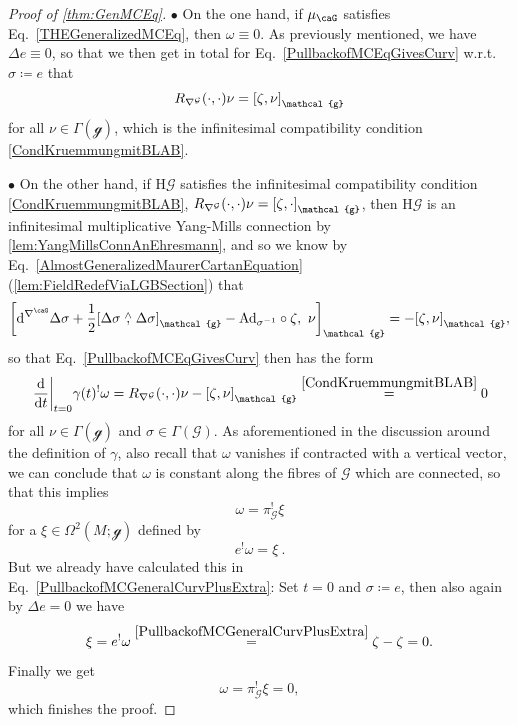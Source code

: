 \documentclass[reqno,a4paper,oneside]{amsart}
\newcommand\mutot{\mu_\caG}
\theoremstyle{plain}
\theoremstyle{remark}
\theoremstyle{definition}
\begin{document}
\begin{proof}[Proof of \ref{thm:GenMCEq}]
$\bullet$ On the one hand, if $\mutot$ satisfies Eq.\ \eqref{THEGeneralizedMCEq}, then $\omega \equiv 0$. As previously mentioned, we have $\Delta e \equiv 0$, so that we then get in total for Eq.\ \eqref{PullbackofMCEqGivesCurv} w.r.t.\ $\sigma \coloneqq e$ that
\begin{equation*}
R_{\nabla^{\mathcal{G}}} (\cdot, \cdot) \nu
=
\mleft[ \zeta, \nu \mright]_{\mathcal{g}}
\end{equation*}
for all $\nu \in \Gamma(\mathcal{g})$, which is the infinitesimal compatibility condition \eqref{CondKruemmungmitBLAB}.

$\bullet$ On the other hand, if $\mathrm{H}\mathcal{G}$ satisfies the infinitesimal compatibility condition \eqref{CondKruemmungmitBLAB}, $R_{\nabla^{\mathcal{G}}} (\cdot, \cdot) \nu = \mleft[ \zeta, \cdot \mright]_{\mathcal{g}}$, then $\mathrm{H}\mathcal{G}$ is an infinitesimal multiplicative Yang-Mills connection by \ref{lem:YangMillsConnAnEhresmann}, and so we know by Eq.\ \eqref{AlmostGeneralizedMaurerCartanEquation} (\ref{lem:FieldRedefViaLGBSection}) that 
\begin{equation*}
\mleft[ \mathrm{d}^{\nabla^\caG} \Delta \sigma + \frac{1}{2} \mleft[ \Delta \sigma \stackrel{\wedge}{,} \Delta\sigma \mright]_{\mathcal{g}} - \mathrm{Ad}_{\sigma^{-1}} \circ \zeta, ~ \nu \mright]_{\mathcal{g}}
=
- \mleft[ \zeta, \nu \mright]_{\mathcal{g}},
\end{equation*}
so that Eq.\ \eqref{PullbackofMCEqGivesCurv} then has the form
\begin{equation*}
\mleft.\frac{\mathrm{d}}{\mathrm{d}t}\mright|_{t=0} \gamma(t)^!\omega
=
R_{\nabla^{\mathcal{G}}} (\cdot, \cdot) \nu
	- \mleft[ \zeta, \nu \mright]_{\mathcal{g}}
\stackrel{\eqref{CondKruemmungmitBLAB}}{=}
0
\end{equation*}
for all $\nu \in \Gamma(\mathcal{g})$ and $\sigma \in \Gamma(\mathcal{G})$.
As aforementioned in the discussion around the definition of $\gamma$, also recall that $\omega$ vanishes if contracted with a vertical vector, we can conclude that $\omega$ is constant along the fibres of $\mathcal{G}$ which are connected, so that this implies
\begin{equation*}
\omega
=
\pi_{\mathcal{G}}^!\xi
\end{equation*}
for a $\xi \in \Omega^2(M;\mathcal{g})$ defined by 
\begin{equation*}
e^!\omega 
=
\xi~.
\end{equation*}
But we already have calculated this in Eq.\ \eqref{PullbackofMCGeneralCurvPlusExtra}: Set $t=0$ and $\sigma \coloneqq e$, then also again by $\Delta e = 0$ we have
\begin{equation*}
\xi
=
e^!\omega
\stackrel{\eqref{PullbackofMCGeneralCurvPlusExtra}}{=}
\zeta
	- \zeta
=
0.
\end{equation*}
Finally we get
\begin{equation*}
\omega
=
\pi_{\mathcal{G}}^!\xi
=
0,
\end{equation*}
which finishes the proof.
\end{proof}
\end{document}

